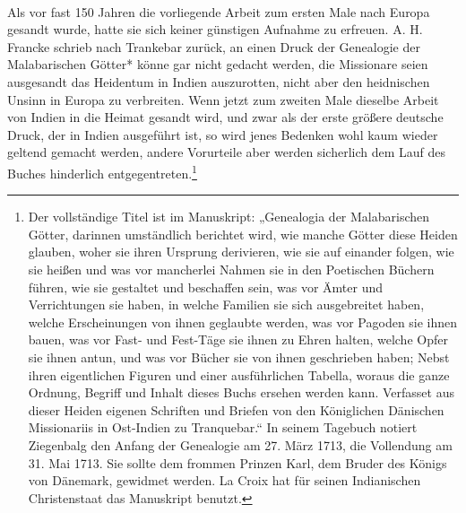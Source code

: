 \documentclass{article}
\begin{document}
\paragraph{}
Als vor fast 150 Jahren die vorliegende Arbeit zum ersten Male nach Europa gesandt wurde, hatte sie sich keiner günstigen Aufnahme zu erfreuen. A. H. Francke schrieb nach Trankebar zurück, an einen Druck der Genealogie der Malabarischen Götter* könne gar nicht gedacht werden, die Missionare seien ausgesandt das Heidentum in Indien auszurotten, nicht aber den heidnischen Unsinn in Europa zu verbreiten. Wenn jetzt zum zweiten Male dieselbe Arbeit von Indien in die Heimat gesandt wird, und zwar als der erste größere deutsche Druck, der in Indien ausgeführt ist, so wird jenes Bedenken wohl kaum wieder geltend gemacht werden, andere Vorurteile aber werden sicherlich dem Lauf des Buches hinderlich entgegentreten.\footnote{Der vollständige Titel ist im Manuskript: „Genealogia der Malabarischen Götter, darinnen umständlich berichtet wird, wie manche Götter diese Heiden glauben, woher sie ihren Ursprung derivieren, wie sie auf einander folgen, wie sie heißen und was vor mancherlei Nahmen sie in den Poetischen Büchern führen, wie sie gestaltet und beschaffen sein, was vor Ämter und Verrichtungen sie haben, in welche Familien sie sich ausgebreitet haben, welche Erscheinungen von ihnen geglaubte werden, was vor Pagoden sie ihnen bauen, was vor Fast- und Fest-Täge sie ihnen zu Ehren halten, welche Opfer sie ihnen antun, und was vor Bücher sie von ihnen geschrieben haben; Nebst ihren eigentlichen Figuren und einer ausführlichen Tabella, woraus die ganze Ordnung, Begriff und Inhalt dieses Buchs ersehen werden kann. Verfasset aus dieser Heiden eigenen Schriften und Briefen von den Königlichen Dänischen Missionariis in Ost-Indien zu Tranquebar.“ In seinem Tagebuch notiert Ziegenbalg den Anfang der Genealogie am 27. März 1713, die Vollendung am 31. Mai 1713. Sie sollte dem frommen Prinzen Karl, dem Bruder des Königs von Dänemark, gewidmet werden. La Croix hat für seinen Indianischen Christenstaat das Manuskript benutzt.}
\end{document}
